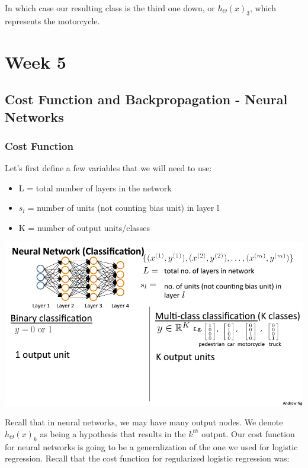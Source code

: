 \documentclass[
]{article}
\providecommand{\tightlist}{%
  \setlength{\itemsep}{0pt}\setlength{\parskip}{0pt}}
\begin{document}
In which case our resulting class is the third one down, or
\(h_\Theta(x)_3\), which represents the motorcycle.

\hypertarget{week-5}{%
\section{Week 5}\label{week-5}}

\hypertarget{cost-function-and-backpropagation---neural-networks}{%
\subsection{Cost Function and Backpropagation - Neural
Networks}\label{cost-function-and-backpropagation---neural-networks}}

\hypertarget{cost-function-2}{%
\subsubsection{Cost Function}\label{cost-function-2}}

Let's first define a few variables that we will need to use:

\begin{itemize}
\tightlist
\item
  L = total number of layers in the network
\item
  \(s_l\) = number of units (not counting bias unit) in layer l
\item
  K = number of output units/classes
\end{itemize}

\includegraphics{Neural Network cost fun.png}

Recall that in neural networks, we may have many output nodes. We denote
\(h_\Theta(x)_k\) as being a hypothesis that results in the \(k^{th}\)
output. Our cost function for neural networks is going to be a
generalization of the one we used for logistic regression. Recall that
the cost function for regularized logistic regression was:
\end{document}
